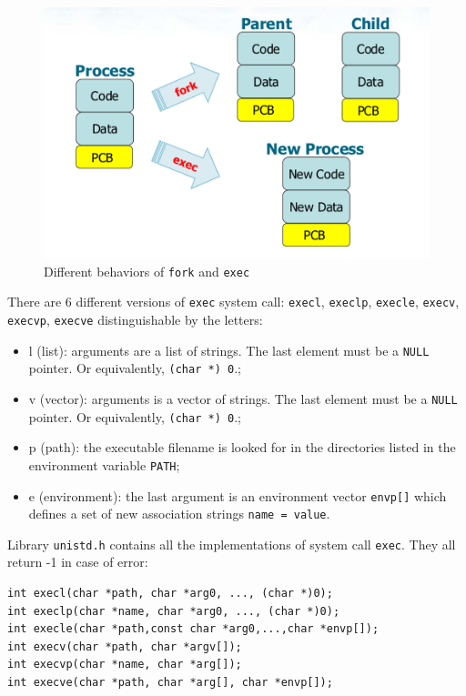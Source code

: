\begin{figure}[hbtp]
\centering
\includegraphics[scale=0.4]{images/processes_concurrency/fork_exec.png}
\caption{Different behaviors of \texttt{fork} and \texttt{exec}}
\end{figure}

There are 6 different versions of \texttt{exec} system call: \texttt{execl}, \texttt{execlp}, \texttt{execle}, \texttt{execv}, \texttt{execvp}, \texttt{execve} distinguishable by the letters:
\begin{itemize}
\item l (list): arguments are a list of strings. The last element must be a \texttt{NULL} pointer. Or equivalently, \texttt{(char *) 0}.;
\item v (vector): arguments is a vector of strings. The last element must be a \texttt{NULL} pointer. Or equivalently, \texttt{(char *) 0}.;
\item p (path): the executable filename is looked for in the directories listed in the environment variable \texttt{PATH};
\item e (environment): the last argument is an environment vector \texttt{envp[]} which defines a set of new association strings \texttt{name = value}.
\end{itemize}

Library \texttt{unistd.h} contains all the implementations of system call \texttt{exec}. They all return -1 in case of error:
\begin{verbatim}
int execl(char *path, char *arg0, ..., (char *)0);
int execlp(char *name, char *arg0, ..., (char *)0);
int execle(char *path,const char *arg0,...,char *envp[]);
int execv(char *path, char *argv[]);
int execvp(char *name, char *arg[]);
int execve(char *path, char *arg[], char *envp[]);
\end{verbatim}

